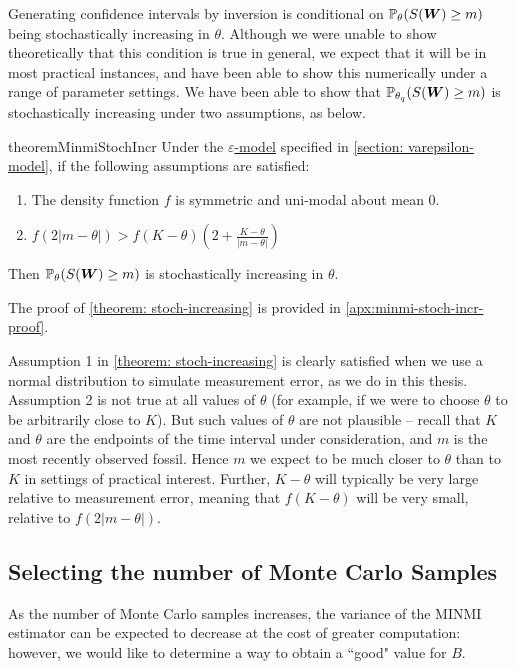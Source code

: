 Generating confidence intervals by inversion is conditional on $\mathbb{P}_{\theta} (S(\bm{W}) \geq m)$ being stochastically increasing in $\theta$. Although we were unable to show theoretically that this condition is true in general, we expect that it will be in most practical instances, and have been able to show this numerically under a range of parameter settings. We have been able to show that $\mathbb{P}_{\theta_q} (S(\bm{W}) \geq m)$ is stochastically increasing under two assumptions, as below.
\begin{restatable}{theorem}{MinmiStochIncr}\label{theorem: stoch-increasing}
    Under the \hyperref[model: measurement-error]{$\varepsilon$-model} specified in \autoref{section: varepsilon-model}, if the following assumptions are satisfied:
    \begin{enumerate}
        \item The density function $f$ is symmetric and uni-modal about mean 0.
        \item $f(2|m-\theta|) > f(K-\theta) \left(2 + \frac{K-\theta}{|m-\theta|} \right)$
    \end{enumerate}
    Then $\mathbb{P}_{\theta} (S(\bm{W}) \geq m)$ is stochastically increasing in $\theta$.
\end{restatable}

The proof of \autoref{theorem: stoch-increasing} is provided in \autoref{apx:minmi-stoch-incr-proof}.

Assumption 1 in \autoref{theorem: stoch-increasing} is clearly satisfied when we use a normal distribution to simulate measurement error, as we do in this thesis. Assumption 2 is not true at all values of $\theta$ (for example, if we were to choose $\theta$ to be arbitrarily close to $K$). But such values of $\theta$ are not plausible -- recall that $K$ and $\theta$ are the endpoints of the time interval under consideration, and $m$ is the most recently observed fossil. Hence $m$ we expect to be much closer to $\theta$ than to $K$ in settings of practical interest. Further, $K-\theta$ will typically be very large relative to measurement error, meaning that $f(K-\theta)$ will be very small, relative to $f(2|m-\theta|)$.

\subsection{Selecting the number of Monte Carlo Samples}\label{subsec:minmi-mce-var}

As the number of Monte Carlo samples increases, the variance of the MINMI estimator can be expected to decrease at the cost of greater computation: however, we would like to determine a way to obtain a ``good" value for $B$.

